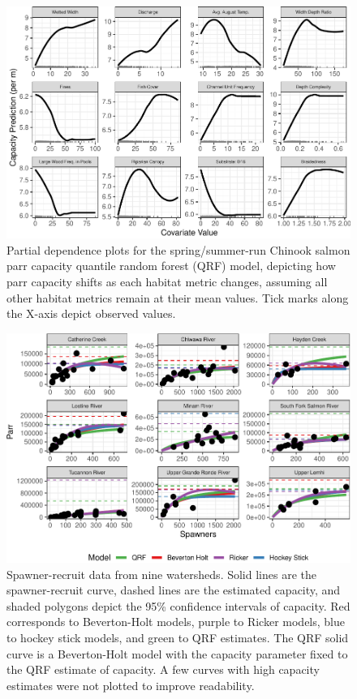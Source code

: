 \documentclass[
  12pt,
]{article}
\begin{document}
\newpage

\begin{figure}
\centering
\includegraphics{../figures/pdp-figure-1.pdf}
\caption{\label{fig:pdp-figure}Partial dependence plots for the spring/summer-run Chinook salmon parr capacity quantile random forest (QRF) model, depicting how parr capacity shifts as each habitat metric changes, assuming all other habitat metrics remain at their mean values. Tick marks along the X-axis depict observed values.}
\end{figure}

\newpage

\begin{figure}
\centering
\includegraphics{../figures/sr-figure-1.pdf}
\caption{\label{fig:sr-figure}Spawner-recruit data from nine watersheds. Solid lines are the spawner-recruit curve, dashed lines are the estimated capacity, and shaded polygons depict the 95\% confidence intervals of capacity. Red corresponds to Beverton-Holt models, purple to Ricker models, blue to hockey stick models, and green to QRF estimates. The QRF solid curve is a Beverton-Holt model with the capacity parameter fixed to the QRF estimate of capacity. A few curves with high capacity estimates were not plotted to improve readability.}
\end{figure}
\end{document}
